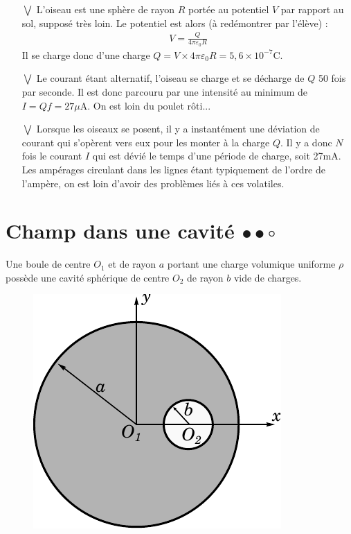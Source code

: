\documentclass{report}
\begin{document}
\begin{itemize}

	\item[$\bigvee$] L'oiseau est une sphère de rayon $R$ portée au potentiel $V$ par rapport au sol, supposé très loin. Le potentiel est alors (à redémontrer par l'élève) :
	\begin{align*}
		V=\frac{Q}{4\pi\varepsilon_0 R}
	\end{align*}
	Il se charge donc d'une charge $Q=V\times 4\pi\varepsilon_0R=5,6\times10^{-7}$C.
	
	\item[$\bigvee$] Le courant étant alternatif, l'oiseau se charge et se décharge de $Q$ 50 fois par seconde. Il est donc parcouru par une intensité au minimum de $I=Qf=27\mu$A. On est loin du poulet rôti...
	
	\item[$\bigvee$] Lorsque les oiseaux se posent, il y a instantément une déviation de courant qui s'opèrent vers eux pour les monter à la charge $Q$. Il y a donc $N$ fois le courant $I$ qui est dévié le temps d'une période de charge, soit 27mA. Les ampérages circulant dans les lignes étant typiquement de l'ordre de l'ampère, on est loin d'avoir des problèmes liés à ces volatiles.

\end{itemize} 

\newpage		

\section*{Champ dans une cavité $\bullet\bullet\circ$}

Une boule de centre $O_1$ et de rayon $a$ portant une charge volumique uniforme $\rho$ possède une cavité sphérique de centre $O_2$ de rayon $b$ vide de charges.

\begin{figure}[h!]
\centering
		\includegraphics[scale=0.7]{em_cavite.pdf}
\end{figure}
\end{document}
